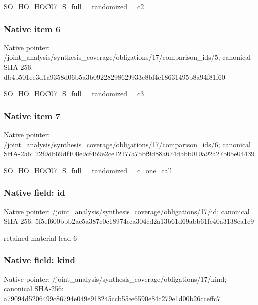 \documentclass[10pt,a4paper]{article}
\begin{document}
\begingroup\raggedright\sloppy SO\_\allowbreak{}HO\_\allowbreak{}HOC07\_\allowbreak{}S\_\allowbreak{}full\_\allowbreak{}\_\allowbreak{}randomized\_\allowbreak{}\_\allowbreak{}c2\par\endgroup

\subsubsection{Native item 6}
Native pointer: /joint\_\allowbreak{}analysis/synthesis\_\allowbreak{}coverage/obligations/17/comparison\_\allowbreak{}ids/5; canonical SHA-256: db4b501ee3d1a9358d06b5a3b09228298629933e8bf4c18631495b8a94f81f60

\begingroup\raggedright\sloppy SO\_\allowbreak{}HO\_\allowbreak{}HOC07\_\allowbreak{}S\_\allowbreak{}full\_\allowbreak{}\_\allowbreak{}randomized\_\allowbreak{}\_\allowbreak{}c3\par\endgroup

\subsubsection{Native item 7}
Native pointer: /joint\_\allowbreak{}analysis/synthesis\_\allowbreak{}coverage/obligations/17/comparison\_\allowbreak{}ids/6; canonical SHA-256: 22f9db69df100e9cf459e2ce12177a75bf9d88a674d5bb010a92a27b05e04439

\begingroup\raggedright\sloppy SO\_\allowbreak{}HO\_\allowbreak{}HOC07\_\allowbreak{}S\_\allowbreak{}full\_\allowbreak{}\_\allowbreak{}randomized\_\allowbreak{}\_\allowbreak{}c\_\allowbreak{}one\_\allowbreak{}call\par\endgroup

\subsubsection{Native field: id}
Native pointer: /joint\_\allowbreak{}analysis/synthesis\_\allowbreak{}coverage/obligations/17/id; canonical SHA-256: 5f5ef600bbb2ac5a387c0c18974eca304cd2a13b61d69abb61fe40a3138ea1c9

\begingroup\raggedright\sloppy retained-material-lead-6\par\endgroup

\subsubsection{Native field: kind}
Native pointer: /joint\_\allowbreak{}analysis/synthesis\_\allowbreak{}coverage/obligations/17/kind; canonical SHA-256: a79094d5206499c86794e049e918245ccb55ee6590e84c279e1d00b26cceffc7
\end{document}
